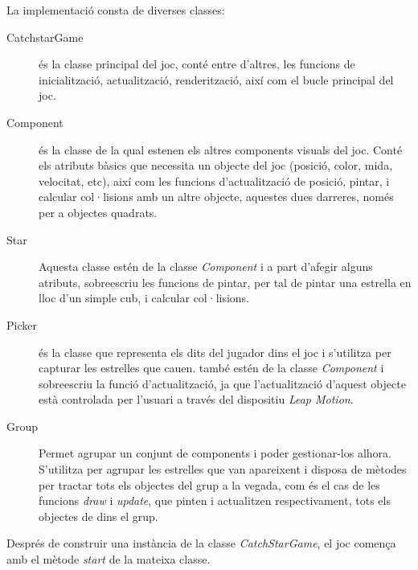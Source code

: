 \documentclass[12pt,a4paper,catalan]{article}
\begin{document}
	La implementació consta de diverses classes:
	\begin{description}
		\item[CatchstarGame] és la classe principal del joc, conté entre d'altres, les funcions de inicialització, actualització, renderització, així com el bucle principal del joc.
		\item[Component] és la classe de la qual estenen els altres components visuals del joc. Conté els atributs bàsics que necessita un objecte del joc (posició, color, mida, velocitat, etc), així com les funcions d'actualització de posició, pintar, i calcular col·lisions amb un altre objecte, aquestes dues darreres, només per a objectes quadrats.
		\item[Star] Aquesta classe estén de la classe \textit{Component} i a part d'afegir alguns atributs, sobreescriu les funcions de pintar, per tal de pintar una estrella en lloc d'un simple cub, i calcular col·lisions.
		\item[Picker] és la classe que representa els dits del jugador dins el joc i s'utilitza per capturar les estrelles que cauen. també estén de la classe \textit{Component} i sobreescriu la funció d'actualització, ja que l'actualització d'aquest objecte està controlada per l'usuari a través del dispositiu \textit{Leap Motion}.
		\item[Group] Permet agrupar un conjunt de components i poder gestionar-los alhora. S'utilitza per agrupar les estrelles que van apareixent i disposa de mètodes per tractar tots els objectes del grup a la vegada, com és el cas de les funcions \textit{draw} i \textit{update}, que pinten i actualitzen respectivament, tots els objectes de dins el grup.
	\end{description}
	Després de construir una instància de la classe \textit{CatchStarGame}, el joc comença amb el mètode \textit{start} de la mateixa classe.
	
\end{document}
